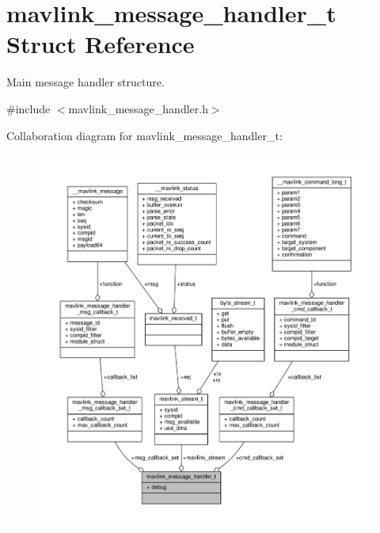 \hypertarget{structmavlink__message__handler__t}{\section{mavlink\+\_\+message\+\_\+handler\+\_\+t Struct Reference}
\label{structmavlink__message__handler__t}
}


Main message handler structure.  




{\ttfamily \#include $<$mavlink\+\_\+message\+\_\+handler.\+h$>$}



Collaboration diagram for mavlink\+\_\+message\+\_\+handler\+\_\+t\+:
\nopagebreak
\begin{figure}[H]
\begin{center}
\leavevmode
\includegraphics[width=350pt]{structmavlink__message__handler__t__coll__graph}
\end{center}
\end{figure}
